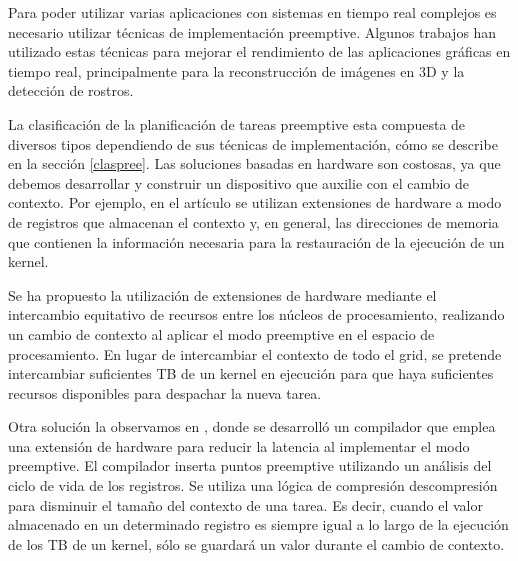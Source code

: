 Para poder utilizar varias aplicaciones con sistemas en tiempo real complejos es necesario utilizar técnicas de implementación preemptive. Algunos trabajos han utilizado estas técnicas para mejorar el rendimiento de las aplicaciones gráficas en tiempo real, principalmente para la reconstrucción de imágenes en 3D y la detección de rostros.
\newline

La clasificación de la planificación de tareas preemptive esta compuesta de diversos tipos dependiendo de sus técnicas de implementación, cómo se describe en la sección \ref{claspree}. 
Las soluciones basadas en hardware son costosas, ya que debemos desarrollar y construir un dispositivo que auxilie con el cambio de contexto. Por ejemplo, en el artículo \cite{18} se utilizan extensiones de hardware a modo de registros que almacenan el contexto y, en general, las direcciones de memoria que contienen la información necesaria para la restauración de la ejecución de un kernel. 

\vspace{0.3cm}

Se ha propuesto\cite{20} la utilización de extensiones de hardware mediante el intercambio equitativo de recursos entre los núcleos de procesamiento, realizando un cambio de contexto al aplicar el modo preemptive en el espacio de procesamiento. En lugar de intercambiar el contexto de todo el grid, se pretende intercambiar suficientes TB de un kernel en ejecución para que haya suficientes recursos disponibles para despachar la nueva tarea. 

\vspace{0.3cm}

Otra solución la observamos en \cite{8}, donde se desarrolló un compilador que emplea una extensión de hardware para reducir la latencia al implementar el modo preemptive. El compilador inserta puntos preemptive utilizando un análisis del ciclo de vida de los registros. Se utiliza una lógica de compresión descompresión para disminuir el tamaño del contexto de una tarea. Es decir, cuando el valor almacenado en un determinado registro es siempre igual a lo largo de la ejecución de los TB de un kernel, sólo se guardará un valor durante el cambio de contexto.
\newline

